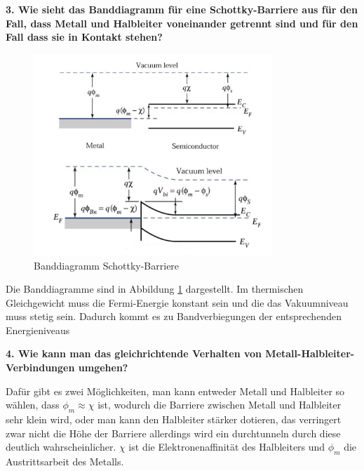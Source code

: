 \noindent\textbf{3. Wie sieht das Banddiagramm für eine Schottky-Barriere aus für den Fall, dass Metall und Halbleiter voneinander getrennt sind und für den Fall dass sie in Kontakt stehen?}\\
\begin{addmargin}[25pt]{0pt}
    \begin{figure}[h]
        \centering
        \includegraphics[width = 0.8\textwidth]{images/KM2/Schottky-Barriere.jpeg}
        \caption{Banddiagramm Schottky-Barriere}
        \label{fig:Schottky-Barriere}
    \end{figure}
    Die Banddiagramme sind in Abbildung \ref{fig:Schottky-Barriere} dargestellt. Im thermischen Gleichgewicht muss die Fermi-Energie konstant sein und die das Vakuumniveau muss stetig sein. Dadurch kommt es zu Bandverbiegungen der entsprechenden Energieniveaus\\
\end{addmargin}

\noindent\textbf{4. Wie kann man das gleichrichtende Verhalten von Metall-Halbleiter-Verbindungen umgehen?}\\
\begin{addmargin}[25pt]{0pt}
Dafür gibt es zwei Möglichkeiten, man kann entweder Metall und Halbleiter so wählen, dass $\phi_m \approx \chi$ ist, wodurch die Barriere zwischen Metall und Halbleiter sehr klein wird, oder man kann den Halbleiter stärker dotieren, das verringert zwar nicht die Höhe der Barriere allerdings wird ein durchtunneln durch diese deutlich wahrscheinlicher. $\chi$ ist die Elektronenaffinität des Halbleiters und $\phi_m$ die Austrittsarbeit des Metalls.   \\
\end{addmargin}

